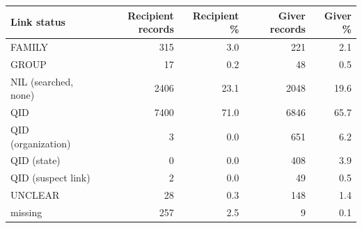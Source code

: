 \begin{tabular}{lrrrr}
\toprule
Link status & Recipient records & Recipient \% & Giver records & Giver \% \\
\midrule
FAMILY & 315 & 3.0 & 221 & 2.1 \\
GROUP & 17 & 0.2 & 48 & 0.5 \\
NIL (searched, none) & 2406 & 23.1 & 2048 & 19.6 \\
QID & 7400 & 71.0 & 6846 & 65.7 \\
QID (organization) & 3 & 0.0 & 651 & 6.2 \\
QID (state) & 0 & 0.0 & 408 & 3.9 \\
QID (suspect link) & 2 & 0.0 & 49 & 0.5 \\
UNCLEAR & 28 & 0.3 & 148 & 1.4 \\
missing & 257 & 2.5 & 9 & 0.1 \\
\bottomrule
\end{tabular}
\par{}
